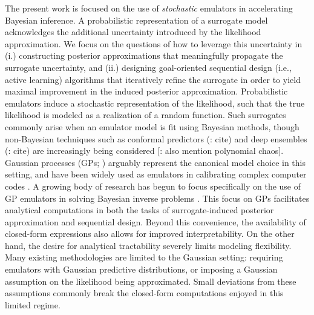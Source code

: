 \documentclass[12pt]{article}
\begin{document}
The present work is focused on the use of \textit{stochastic} emulators in accelerating Bayesian inference.
A probabilistic representation of a surrogate model acknowledges the additional uncertainty introduced by the likelihood 
approximation. We focus on the questions of how to leverage this uncertainty in (i.) constructing posterior approximations 
that meaningfully propagate the surrogate uncertainty, and (ii.) designing goal-oriented sequential design (i.e., active learning) 
algorithms that iteratively refine the surrogate in order to yield maximal improvement in the induced posterior approximation. 
Probabilistic emulators induce a stochastic representation of the likelihood, such that the true likelihood is 
modeled as a realization of a random function. Such surrogates commonly arise when an emulator
model is fit using Bayesian methods, though non-Bayesian techniques such as conformal predictors (\todo: cite) and 
deep ensembles (\todo: cite) are increasingly being considered [\todo: also mention polynomial chaos]. 
Gaussian processes (GPs; \citet{gpML}) arguably represent the canonical model choice in this setting,
 and have been widely used as emulators in calibrating complex computer codes 
\citep{design_analysis_computer_experiments,SanterCompExp,gramacy2020surrogates}. A growing body of research 
has begun to focus specifically on the use of GP emulators in solving Bayesian inverse problems
\citep{KOH,StuartTeck1,StuartTeck2,VehtariParallelGP,gp_surrogates_random_exploration,quantileApprox,FerEmulation,
KandasamyActiveLearning2015,CES,Kandasamy_2017,SinsbeckNowak,Surer2023sequential,llikRBF,
ranjan2016inverse,weightedIVAR,hydrologicalModel,VillaniAdaptiveGP,GP_PDE_priors,random_fwd_models,ActiveLearningMCMC,
MCMC_GP_proposal,trainDynamics}. 
This focus on GPs facilitates analytical computations 
in both the tasks of surrogate-induced posterior approximation and sequential design. Beyond this convenience, the availability of 
closed-form expressions also allows for improved interpretability. On the other hand, the desire for analytical tractability
severely limits modeling flexibility. Many existing methodologies are limited to the Gaussian setting: requiring emulators with 
Gaussian predictive distributions, or imposing a Gaussian assumption on the likelihood being approximated.
Small deviations from these assumptions commonly break the closed-form computations enjoyed in this limited regime.
\end{document}
